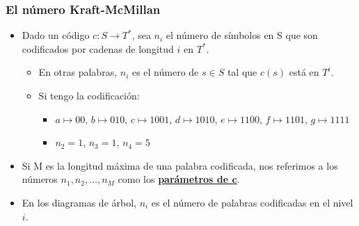 \documentclass{beamer}
\begin{document}
\begin{frame}    \frametitle{El número Kraft-McMillan}  \small

\begin{itemize}
\item Dado un código $c: S\rightarrow T^{*}$, sea $n_{i}$ el número de símbolos en S que son codificados por cadenas de longitud $i$ en $T^{*}$. 
	\begin{itemize}
		\item En otras palabras, $n_{i}$ es el número de $s \in S$ tal que $c(s)$ está en $T^{i}$.  
        \item Si tengo la codificación: 

        \begin{itemize}
            \item $a \mapsto 00$, $ b  \mapsto 010 $,   $ c  \mapsto 1001 $, $ d  \mapsto 1010 $, $ e  \mapsto 1100 $, $ f  \mapsto 1101 $, $ g  \mapsto 1111 $
              \item $n_2 = 1$, $n_3 = 1$, $n_4 = 5 $
        \end{itemize}
	\end{itemize}

\item Si M es la longitud máxima de una palabra codificada, nos referimos a los números $n_{1}, n_{2},\ldots,n_{M}$ como los \textbf{\underline{parámetros de c}}. 

\item En los diagramas de árbol, $n_{i}$ es el número de palabras codificadas en el nivel $i$.



\end{itemize}

\end{frame}
\end{document}
